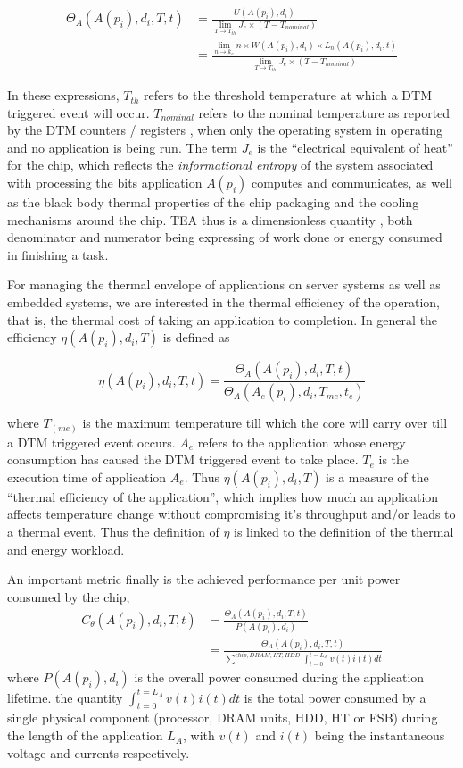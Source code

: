 \documentclass[times,12pt,onecolumn]{article}
\begin{document}
\begin{align}
\Theta_A(A(p_i),d_i, T, t) &= \frac{U(A(p_i),d_i)}{\displaystyle \lim_{T \to T_{th}} J_e \times (T - T_{nominal})}  \nonumber\\
					      &= \frac{\displaystyle \lim_{n \to k_e }n \times W(A(p_i),d_i) \times L_n(A(p_i),d_i,t)}{\displaystyle \lim_{T \to T_{th}} J_e \times (T - T_{nominal})} \nonumber
\end{align}

In these expressions, $T_{th}$ refers to the threshold temperature at
which a DTM triggered event will occur.  $T_{nominal}$ refers to the
nominal temperature as reported by the DTM counters / registers , when
only the operating system in operating and no application is being run.
The term $J_e$ is the ``electrical equivalent of heat'' for the chip,
which reflects the \textit{informational entropy} of the system
associated with processing the bits application $A(p_i)$ computes and
communicates, as well as the black body thermal properties of the chip
packaging and the cooling mechanisms around the chip. TEA thus is a
dimensionless quantity , both denominator and numerator being expressing
of work done or energy consumed in finishing a task.

For managing the thermal envelope of applications on server systems as
well as embedded systems, we are interested in the thermal efficiency of
the operation, that is, the thermal cost of taking an application to
completion. In general the efficiency $\eta(A(p_i), d_i,T)$ is defined
as

\begin{equation}
\eta(A(p_i), d_i,T, t) = \frac{\Theta_A(A(p_i),d_i, T, t)}{\Theta_A(A_e(p_i),d_i, T_{me}, t_e)} \nonumber
\end{equation}

where $T_(me)$ is the maximum temperature till which the core will carry
over till a DTM triggered event occurs. $A_e$ refers to the application
whose energy consumption has caused the DTM triggered event to take
place. $T_e$ is the execution time of application $A_e$. Thus
$\eta(A(p_i), d_i,T)$ is a measure of the ``thermal efficiency of the
application'', which implies how much an application affects temperature
change without compromising it's throughput and/or leads to a thermal
event. Thus the definition of $\eta$ is linked to the definition of the
thermal and energy workload.

An important metric finally is the achieved performance per unit power
consumed by the chip,
\begin{align}
C_{\theta}(A(p_i), d_i, T, t) &= \frac{\Theta_A(A(p_i),d_i, T, t)}{P(A(p_i),d_i)} \nonumber\\
	             			 &= \frac{\Theta_A(A(p_i),d_i, T, t)}{\displaystyle \sum^{chip,DRAM,HT,HDD} \int_{t=0}^{t=L_A}v(t)i(t)dt} \nonumber
\end{align}
where $P(A(p_i),d_i)$ is the overall power consumed during the
application lifetime. the quantity $\int_{t=0}^{t=L_A}v(t)i(t)dt$ is the
total power consumed by a single physical component (processor, DRAM
units, HDD, HT or FSB) during the length of the application $L_A$, with
$v(t)$ and $i(t)$ being the instantaneous voltage and currents
respectively.
\end{document}
